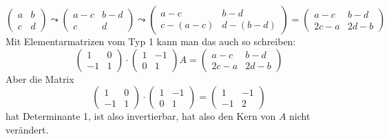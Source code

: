 \documentclass[11pt,a4paper]{article}
\begin{document}
	$$ \begin{pmatrix} a&b\\c&d\end{pmatrix} \leadsto \begin{pmatrix}a-c&b-d\\c&d \end{pmatrix}\leadsto \begin{pmatrix}a-c&b-d\\c-(a-c)&d-(b-d)\end{pmatrix} = \begin{pmatrix}a-c & b-d\\2c-a & 2d-b\end{pmatrix}
	$$
	Mit Elementarmatrizen vom Typ 1 kann man das auch so schreiben:
	$$ \begin{pmatrix}1&0\\-1&1 \end{pmatrix}\cdot \begin{pmatrix}1&-1\\0&1 \end{pmatrix}A = \begin{pmatrix}a-c&b-d\\2c-a&2d-b\end{pmatrix}
	$$
	Aber die Matrix
	$$ \begin{pmatrix}1&0\\-1&1 \end{pmatrix}\cdot \begin{pmatrix}1&-1\\0&1 \end{pmatrix} = \begin{pmatrix} 1&-1\\-1&2\end{pmatrix}
	$$
	hat Determinante 1, ist also invertierbar, hat also den Kern von $A$ nicht verändert.
	
\end{document}
